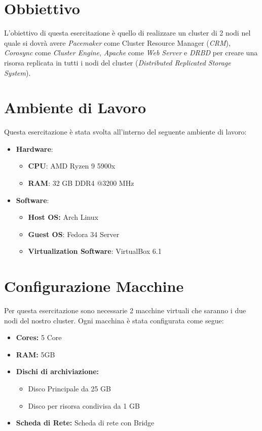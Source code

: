 \section{Obbiettivo}

L'obiettivo di questa esercitazione \`{e}  quello di realizzare un cluster di 2 nodi nel quale si dovrà avere \textit{Pacemaker} come Cluster Resource Manager (\textit{CRM}), \textit{Corosync} come \textit{Cluster Engine}, \textit{Apache} come \textit{Web Server} e \textit{DRBD} per creare una risorsa replicata in tutti i nodi del cluster (\textit{Distributed Replicated Storage System}).

\section{Ambiente di Lavoro}

Questa esercitazione \`{e} stata svolta all'interno del seguente ambiente di lavoro:

\begin{itemize}
	\item \textbf{Hardware}: 
		\begin{itemize}
			\item \textbf{CPU}: AMD Ryzen 9 5900x
			\item \textbf{RAM}: 32 GB DDR4 @3200 MHz
		\end{itemize}
	\item \textbf{Software}:
		\begin{itemize}
			\item \textbf{Host OS:} Arch Linux
			\item \textbf{Guest OS}: Fedora 34 Server
			\item \textbf{Virtualization Software}: VirtualBox 6.1
		\end{itemize}
\end{itemize}

\section{Configurazione Macchine}

Per questa esercitazione sono necessarie 2 macchine virtuali che saranno i due nodi del nostro cluster. Ogni macchina \`{e} stata configurata come segue:

\begin{itemize}
	\item \textbf{Cores:} 5 Core
	\item \textbf{RAM:} 5GB
	\item \textbf{Dischi di archiviazione:}
		\begin{itemize}
			\item Disco Principale da 25 GB
			\item Disco per risorsa condivisa da 1 GB
		\end{itemize}
	\item \textbf{Scheda di Rete:} Scheda di rete con Bridge
\end{itemize}

